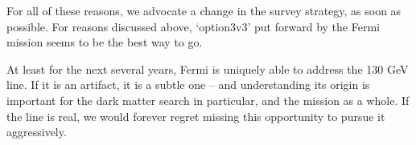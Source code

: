 \documentclass[aps,prd,superscriptaddress,nofootinbib,fixlfloat, 12pt]{revtex4-1}
\begin{document}
For all of these reasons, we advocate a change in the survey strategy, as soon
as possible. For reasons discussed above, `option3v3' put forward by the Fermi
mission seems to be the best way to go.

At least for the next several years, Fermi is uniquely able to address the 130
GeV line.  If it is an artifact, it is a subtle one -- and understanding its
origin is important for the dark matter search in
particular, and the mission as a whole. If the line is real, we would forever
regret missing this opportunity to pursue it aggressively. 

\clearpage

\end{document}
